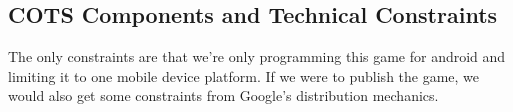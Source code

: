 \subsection{COTS Components and Technical Constraints}

The only constraints are that we’re only programming this game for android and limiting it to one mobile device platform. If we were to publish the game, we would also get some constraints from Google’s distribution mechanics.